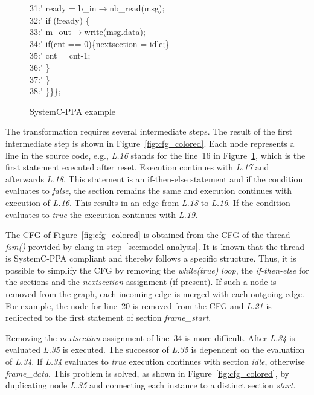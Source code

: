 \begin{figure}
\begin{minipage}{0.9\linewidth}
\begin{tabbing}
31:\'\>\>\>\> ready = b\_in$\rightarrow$nb\_read(msg);\\
32:\'\>\>\>\> if (!ready) \{ \\
33:\'\>\>\>\>\> m\_out$\rightarrow$write(msg.data);\\
34:\'\>\>\>\>\> if(cnt == 0)\{nextsection = idle;\}\\
35:\'\>\>\>\>\> cnt = cnt-1;\\
36:\'\>\>\>\> \}\\
37:\'\>\>\> \}\\
38:\'\>\> \}\}\};\\
    \end{tabbing}
  \end{minipage}
  
  \caption{SystemC-PPA example}
  \label{fig:system-c-example-complex}
\end{figure}



The transformation requires several intermediate steps.
The result of the first intermediate step is shown in Figure~\ref{fig:cfg_colored}.
Each node represents a line in the source code, e.g., \textit{L.16} stands for the line~16 in Figure~\ref{fig:system-c-example-complex}, which is the first statement executed after reset. 
Execution continues with \textit{L.17} and afterwards \textit{L.18}.
This statement is an if-then-else statement and if the condition evaluates to \textit{false}, the section remains the same and execution continues with execution of \textit{L.16}. 
This results in an edge from \textit{L.18} to \textit{L.16}. 
If the condition evaluates to \textit{true} the execution continues with \textit{L.19}.

The CFG of Figure~\ref{fig:cfg_colored} is obtained from the CFG of the thread \textit{fsm()} provided by clang in step~\ref{sec:model-analysis}. 
It is known that the thread is SystemC-PPA compliant and thereby follows a specific structure.
Thus, it is possible to simplify the CFG by removing the \emph{while(true) loop}, the \emph{if-then-else} for the sections and the \emph{nextsection} assignment (if present). 
If such a node is removed from the graph, each incoming edge is merged with each outgoing edge. 
For example, the node for line~20 is removed from the CFG and \textit{L.21} is redirected to the first statement of section \textit{frame\_start}. 

Removing the \textit{nextsection} assignment of line~34 is more difficult. 
After \textit{L.34} is evaluated \textit{L.35} is executed. 
The successor of \textit{L.35} is dependent on the evaluation of \textit{L.34}. 
If \textit{L.34} evaluates to \textit{true} execution continues with section \textit{idle}, otherwise \textit{frame\_data}. 
This problem is solved, as shown in Figure~\ref{fig:cfg_colored}, by duplicating node \textit{L.35} and connecting each instance to a distinct section \textit{start}. 


